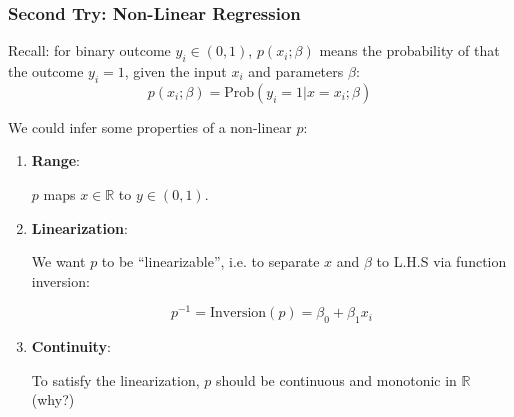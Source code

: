 \documentclass[10pt,aspectratio=169]{beamer}
\begin{document}
\begin{frame}
  \frametitle{Second Try: Non-Linear Regression}

  
  Recall: for binary outcome $y_{i} \in (0, 1)$, $p(x_{i}; \beta)$
  means the probability of that the outcome $y_{i}=1$, given the input
  $x_{i}$ and parameters $\beta$:
  \begin{equation*}
    p(x_{i}; \beta) = \mathrm{Prob}(y_{i}=1 | x=x_{i}; \beta)
  \end{equation*}

  \vspace{1em}

  We could infer some properties of a non-linear $p$:
  \begin{enumerate}
  \item \textbf{Range}:

    $p$ maps $x \in \mathbb{R}$ to $y \in (0, 1)$.
    
  \item \textbf{Linearization}:

    We want $p$ to be ``linearizable'', i.e. to separate $x$ and
    $\beta$ to L.H.S via function inversion:

    \begin{equation*}
      p^{-1} = \mathrm{Inversion}(p) = \beta_{0} + \beta_{1} x_{i}
    \end{equation*}

  \item \textbf{Continuity}:

    To satisfy the linearization, $p$ should be continuous and
    monotonic in $\mathbb{R}$ (why?)
    
  \end{enumerate}
  
\end{frame}
\end{document}
